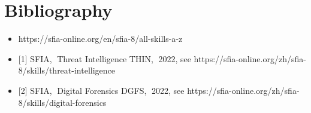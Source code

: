 \documentclass[a4paper, 11pt]{report}
\begin{document}
\newpage

\section{Bibliography} 
\begin{itemize}
\item{{https://sfia-online.org/en/sfia-8/all-skills-a-z}}
\item{[1] SFIA, Threat Intelligence THIN, 2022, see https://sfia-online.org/zh/sfia-8/skills/threat-intelligence}
\item{[2] SFIA, Digital Forensics DGFS, 2022, see https://sfia-online.org/zh/sfia-8/skills/digital-forensics}


\end{itemize}
\end{document}
